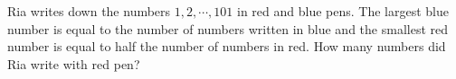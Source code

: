 Ria writes down the numbers $1,2,\cdots, 101$ in red and blue pens. The largest blue number is equal to the number of numbers written in blue and the smallest red number is equal to half the number of numbers in red. How many numbers did Ria write with red pen?
